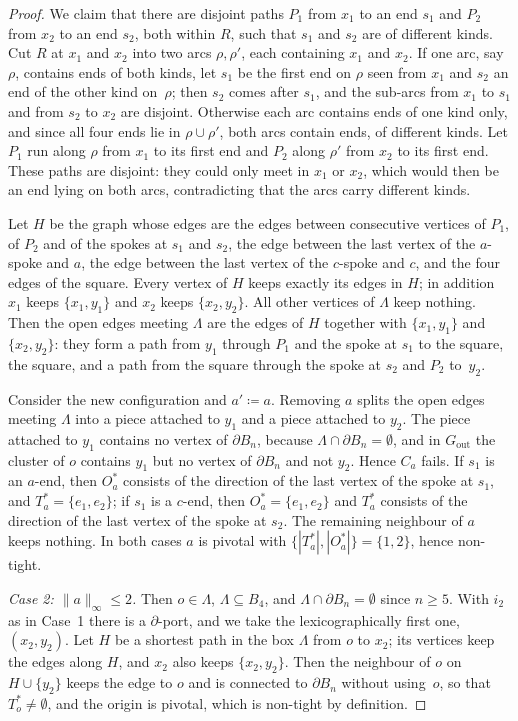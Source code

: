 \documentclass[11pt,letterpaper]{article}
\begin{document}
\begin{proof}
We claim that there are disjoint paths $P_1$ from $x_1$ to an end $s_1$ and $P_2$ from $x_2$ to an end $s_2$, both within $R$, such that $s_1$ and $s_2$ are of different kinds. Cut $R$ at $x_1$ and $x_2$ into two arcs $\rho,\rho'$, each containing $x_1$ and $x_2$. If one arc, say $\rho$, contains ends of both kinds, let $s_1$ be the first end on $\rho$ seen from $x_1$ and $s_2$ an end of the other kind on~$\rho$; then $s_2$ comes after $s_1$, and the sub-arcs from $x_1$ to $s_1$ and from $s_2$ to $x_2$ are disjoint. Otherwise each arc contains ends of one kind only, and since all four ends lie in $\rho\cup\rho'$, both arcs contain ends, of different kinds. Let $P_1$ run along $\rho$ from $x_1$ to its first end and $P_2$ along $\rho'$ from $x_2$ to its first end. These paths are disjoint: they could only meet in $x_1$ or $x_2$, which would then be an end lying on both arcs, contradicting that the arcs carry different kinds.

Let $H$ be the graph whose edges are the edges between consecutive vertices of $P_1$, of $P_2$ and of the spokes at $s_1$ and $s_2$, the edge between the last vertex of the $a$-spoke and $a$, the edge between the last vertex of the $c$-spoke and $c$, and the four edges of the square. Every vertex of $H$ keeps exactly its edges in $H$; in addition $x_1$ keeps $\{x_1,y_1\}$ and $x_2$ keeps $\{x_2,y_2\}$. All other vertices of $\Lambda$ keep nothing. Then the open edges meeting $\Lambda$ are the edges of $H$ together with $\{x_1,y_1\}$ and $\{x_2,y_2\}$: they form a path from $y_1$ through $P_1$ and the spoke at $s_1$ to the square, the square, and a path from the square through the spoke at $s_2$ and $P_2$ to~$y_2$.

Consider the new configuration and $a'\coloneqq a$. Removing $a$ splits the open edges meeting $\Lambda$ into a piece attached to $y_1$ and a piece attached to $y_2$. The piece attached to $y_1$ contains no vertex of $\partial B_n$, because $\Lambda\cap\partial B_n=\emptyset$, and in $G_{\mathrm{out}}$ the cluster of $o$ contains $y_1$ but no vertex of $\partial B_n$ and not $y_2$. Hence $C_a$ fails. If $s_1$ is an $a$-end, then $O_a^*$ consists of the direction of the last vertex of the spoke at $s_1$, and $T_a^*=\{e_1,e_2\}$; if $s_1$ is a $c$-end, then $O_a^*=\{e_1,e_2\}$ and $T_a^*$ consists of the direction of the last vertex of the spoke at $s_2$. The remaining neighbour of $a$ keeps nothing. In both cases $a$ is pivotal with $\{|T_a^*|,|O_a^*|\}=\{1,2\}$, hence non-tight.

\emph{Case 2: $\|a\|_\infty\le2$.} Then $o\in\Lambda$, $\Lambda\subseteq B_4$, and $\Lambda\cap\partial B_n=\emptyset$ since $n\ge5$. With $i_2$ as in Case~1 there is a $\partial$-port, and we take the lexicographically first one, $(x_2,y_2)$. Let $H$ be a shortest path in the box $\Lambda$ from $o$ to $x_2$; its vertices keep the edges along $H$, and $x_2$ also keeps $\{x_2,y_2\}$. Then the neighbour of $o$ on $H\cup\{y_2\}$ keeps the edge to $o$ and is connected to $\partial B_n$ without using~$o$, so that $T_o^*\ne\emptyset$, and the origin is pivotal, which is non-tight by definition.


\end{proof}
\end{document}
